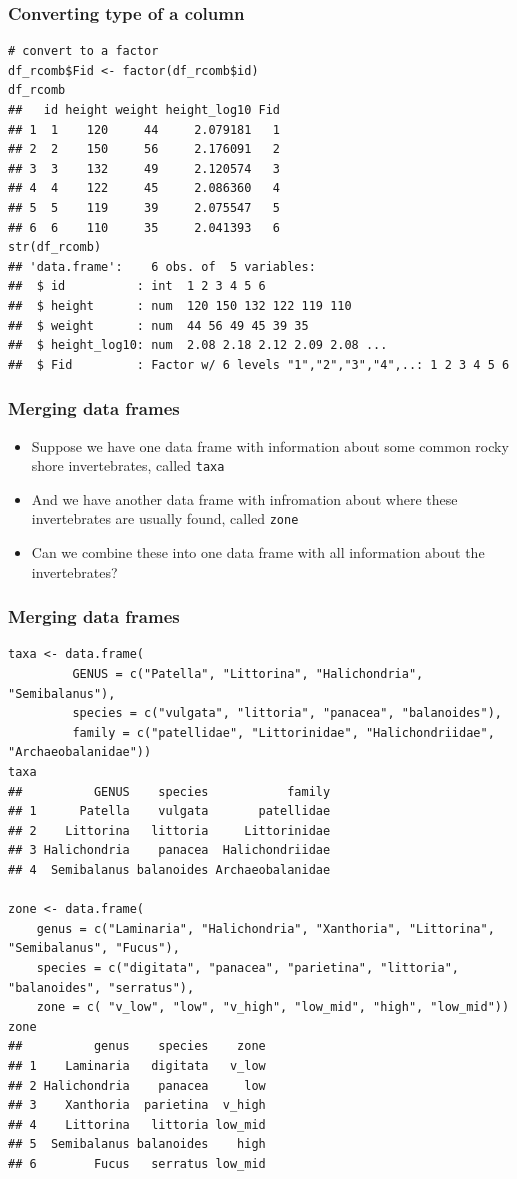 \documentclass{beamer}
\newcommand{\bi}{\begin{itemize}}
\newcommand{\li}{\item}
\newcommand{\ei}{\end{itemize}}
\newcommand{\bfr}[1]{\begin{frame}[fragile]\frametitle{{ #1 }}}
\begin{document}
\bfr{Converting type of a column}
\begin{verbatim}
# convert to a factor 
df_rcomb$Fid <- factor(df_rcomb$id)
df_rcomb
##   id height weight height_log10 Fid
## 1  1    120     44     2.079181   1
## 2  2    150     56     2.176091   2
## 3  3    132     49     2.120574   3
## 4  4    122     45     2.086360   4
## 5  5    119     39     2.075547   5
## 6  6    110     35     2.041393   6
str(df_rcomb)
## 'data.frame':    6 obs. of  5 variables:
##  $ id          : int  1 2 3 4 5 6
##  $ height      : num  120 150 132 122 119 110
##  $ weight      : num  44 56 49 45 39 35
##  $ height_log10: num  2.08 2.18 2.12 2.09 2.08 ...
##  $ Fid         : Factor w/ 6 levels "1","2","3","4",..: 1 2 3 4 5 6
\end{verbatim}
\end{frame}


\bfr{Merging data frames}
\bi
\li Suppose we have one data frame with information about some
common rocky shore invertebrates, called \verb|taxa|
\li And we have another data frame with infromation about where these invertebrates are usually found,
called \verb|zone|
\li Can we combine these into one data frame with all information about the invertebrates?
\ei
\end{frame}

\bfr{Merging data frames}
\scriptsize
\begin{verbatim}
taxa <- data.frame(
         GENUS = c("Patella", "Littorina", "Halichondria", "Semibalanus"),
         species = c("vulgata", "littoria", "panacea", "balanoides"),
         family = c("patellidae", "Littorinidae", "Halichondriidae", "Archaeobalanidae"))
taxa
##          GENUS    species           family
## 1      Patella    vulgata       patellidae
## 2    Littorina   littoria     Littorinidae
## 3 Halichondria    panacea  Halichondriidae
## 4  Semibalanus balanoides Archaeobalanidae

zone <- data.frame(
    genus = c("Laminaria", "Halichondria", "Xanthoria", "Littorina", "Semibalanus", "Fucus"),
    species = c("digitata", "panacea", "parietina", "littoria",    "balanoides", "serratus"),
    zone = c( "v_low", "low", "v_high", "low_mid", "high", "low_mid"))
zone
##          genus    species    zone
## 1    Laminaria   digitata   v_low
## 2 Halichondria    panacea     low
## 3    Xanthoria  parietina  v_high
## 4    Littorina   littoria low_mid
## 5  Semibalanus balanoides    high
## 6        Fucus   serratus low_mid
\end{verbatim}
\end{frame}
\end{document}

